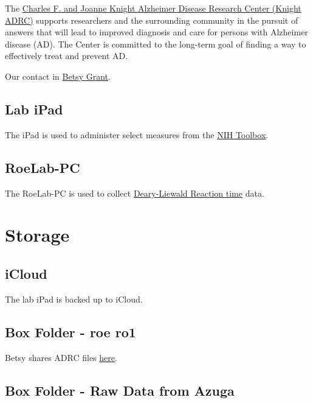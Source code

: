 \documentclass[
]{book}
\begin{document}
The \href{https://knightadrc.wustl.edu/}{Charles F. and Joanne Knight Alzheimer Disease Research Center (Knight ADRC)} supports researchers and the surrounding community in the pursuit of answers that will lead to improved diagnosis and care for persons with Alzheimer disease (AD). The Center is committed to the long-term goal of finding a way to effectively treat and prevent AD.

Our contact in \href{mailto:betsy@wustl.edu}{Betsy Grant}.

\hypertarget{lab-ipad}{%
\subsection{Lab iPad}\label{lab-ipad}}

The iPad is used to administer select measures from the \href{https://www.healthmeasures.net/explore-measurement-systems/nih-toolbox}{NIH Toolbox}.

\hypertarget{roelab-pc}{%
\subsection{RoeLab-PC}\label{roelab-pc}}

The RoeLab-PC is used to collect \href{https://datashare.ed.ac.uk/handle/10283/2085}{Deary-Liewald Reaction time} data.

\hypertarget{storage}{%
\section{Storage}\label{storage}}

\hypertarget{icloud}{%
\subsection{iCloud}\label{icloud}}

The lab iPad is backed up to iCloud.

\hypertarget{box-folder---roe-ro1}{%
\subsection{Box Folder - roe ro1}\label{box-folder---roe-ro1}}

Betsy shares ADRC files \href{https://wustl.app.box.com/folder/21477167502}{here}.

\hypertarget{box-folder---raw-data-from-azuga}{%
\subsection{Box Folder - Raw Data from Azuga}\label{box-folder---raw-data-from-azuga}}
\end{document}
